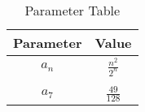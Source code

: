 \documentclass{article}
\begin{document}
\begin{table}[h]
    \centering
    \caption{Parameter Table}
    \begin{tabular}{|c|c|}
        \hline
        \textbf{Parameter} & \textbf{Value} \\
        \hline
        $a_n$ &  $\frac{n^2}{2^n}$\\ \\
	 $a_7$ & $\frac{49}{128}$\\
        \hline
    \end{tabular} 
\end{table}
\end{document}
